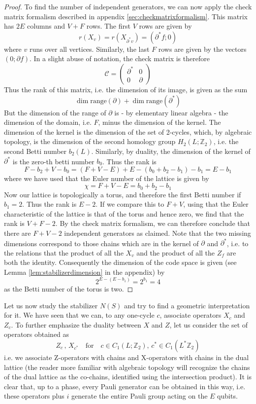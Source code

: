 \documentclass[a4paper, draft]{article}
\theoremstyle{own}
\theoremstyle{remark}
\newcommand{\Z}{\mathbb{Z}}
\begin{document}
\begin{proof}
To find the number of independent generators, we can now apply the check matrix formalism described in appendix \ref{sec:checkmatrixformalism}. This matrix has $2E$ columns and $V + F$ rows. The first $V$ rows are given by
$$
r(X_v) = r(X_{\partial^* v}) = (\partial^* f; 0)
$$
where $v$ runs over all vertices. Similarly, the last $F$ rows are given by the vectors $(0 ; \partial f)$. In a slight abuse of notation, the check matrix is therefore
$$
\mathcal{C}  = \begin{pmatrix} \partial^* & 0 \\ 0 & \partial \end{pmatrix}
$$
Thus the rank of this matrix, i.e. the dimension of its image, is given as the sum
$$
\dim \text{range}(\partial) + \dim \text{range}(\partial^*)
$$
But the dimension of the range of $\partial$ is - by elementary linear algebra - the dimension of the domain, i.e. $F$, minus the dimension of the kernel. The dimension of the kernel is the dimension of the set of 2-cycles, which, by algebraic topology, is the dimension of the second homology group $H_2(L;\Z_2)$, i.e. the second Betti number $b_2(L)$. Similarly, by duality, the dimension of the kernel of $\partial^*$ is the zero-th betti number $b_0$. Thus the rank is
$$
F - b_2 + V - b_0 = (F + V - E) + E - (b_0 + b_2 - b_1) - b_1 = E - b_1
$$
where we have used that the Euler number of the lattice is given by
$$
\chi = F + V - E = b_0 + b_2 - b_1
$$
Now our lattice is topologically a torus, and therefore the first Betti number if $b_1 = 2$. Thus the rank is $E - 2$. If we compare this to $F + V$, using that the Euler characteristic of the lattice is that of the torus and hence zero, we find that the rank is $V + F - 2$. By the check matrix formalism, we can therefore conclude that there are $F + V - 2$ independent generators as claimed. Note that the two missing dimensions correspond to those chains which are in the kernel of $\partial$ and $\partial^*$, i.e. to the relations that the product of all the $X_v$ and the product of all the $Z_f$ are both the identity. Consequently the dimension of the code space is given (see Lemma \ref{lem:stabilizerdimension} in the appendix) by 
$$
2^{E - (E - b_1)} =2^{b_1} = 4
$$
as the Betti number of the torus is two.
\end{proof}



Let us now study the stabilizer $N(S)$ and try to find a geometric interpretation for it. We have seen that we can, to any one-cycle $c$, associate operators $X_c$ and $Z_c$. To further emphasize the duality between $X$ and $Z$, let us consider the set of operators obtained as
$$
Z_c \, , \, X_{c^*} \quad \text{for} \quad c \in C_1(L;\Z_2) , \, c^* \in C_1(L^*\Z_2)
$$
i.e. we associate Z-operators with chains and X-operators with chains in the dual lattice (the reader more familiar with algebraic topology will recognize the chains of the dual lattice as the co-chains, identified using the intersection product). It is clear that, up to a phase, every Pauli generator can be obtained in this way, i.e. these operators plus $i$ generate the entire Pauli group acting on the $E$ qubits.
\end{document}
